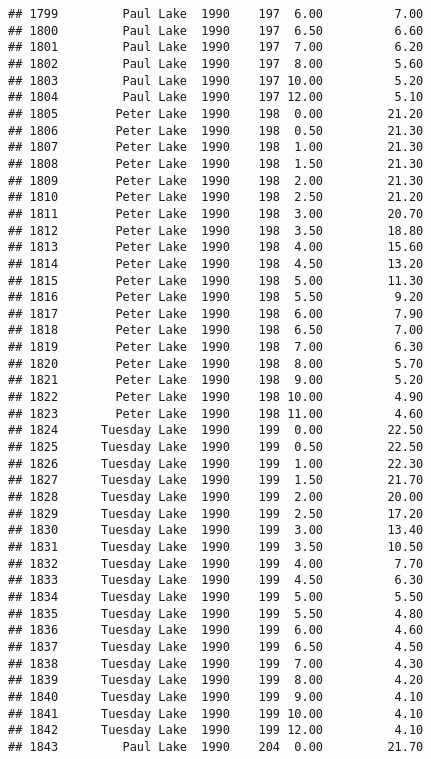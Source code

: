 \documentclass[
]{article}
\begin{document}
\begin{verbatim}
## 1799         Paul Lake  1990    197  6.00          7.00
## 1800         Paul Lake  1990    197  6.50          6.60
## 1801         Paul Lake  1990    197  7.00          6.20
## 1802         Paul Lake  1990    197  8.00          5.60
## 1803         Paul Lake  1990    197 10.00          5.20
## 1804         Paul Lake  1990    197 12.00          5.10
## 1805        Peter Lake  1990    198  0.00         21.20
## 1806        Peter Lake  1990    198  0.50         21.30
## 1807        Peter Lake  1990    198  1.00         21.30
## 1808        Peter Lake  1990    198  1.50         21.30
## 1809        Peter Lake  1990    198  2.00         21.30
## 1810        Peter Lake  1990    198  2.50         21.20
## 1811        Peter Lake  1990    198  3.00         20.70
## 1812        Peter Lake  1990    198  3.50         18.80
## 1813        Peter Lake  1990    198  4.00         15.60
## 1814        Peter Lake  1990    198  4.50         13.20
## 1815        Peter Lake  1990    198  5.00         11.30
## 1816        Peter Lake  1990    198  5.50          9.20
## 1817        Peter Lake  1990    198  6.00          7.90
## 1818        Peter Lake  1990    198  6.50          7.00
## 1819        Peter Lake  1990    198  7.00          6.30
## 1820        Peter Lake  1990    198  8.00          5.70
## 1821        Peter Lake  1990    198  9.00          5.20
## 1822        Peter Lake  1990    198 10.00          4.90
## 1823        Peter Lake  1990    198 11.00          4.60
## 1824      Tuesday Lake  1990    199  0.00         22.50
## 1825      Tuesday Lake  1990    199  0.50         22.50
## 1826      Tuesday Lake  1990    199  1.00         22.30
## 1827      Tuesday Lake  1990    199  1.50         21.70
## 1828      Tuesday Lake  1990    199  2.00         20.00
## 1829      Tuesday Lake  1990    199  2.50         17.20
## 1830      Tuesday Lake  1990    199  3.00         13.40
## 1831      Tuesday Lake  1990    199  3.50         10.50
## 1832      Tuesday Lake  1990    199  4.00          7.70
## 1833      Tuesday Lake  1990    199  4.50          6.30
## 1834      Tuesday Lake  1990    199  5.00          5.50
## 1835      Tuesday Lake  1990    199  5.50          4.80
## 1836      Tuesday Lake  1990    199  6.00          4.60
## 1837      Tuesday Lake  1990    199  6.50          4.50
## 1838      Tuesday Lake  1990    199  7.00          4.30
## 1839      Tuesday Lake  1990    199  8.00          4.20
## 1840      Tuesday Lake  1990    199  9.00          4.10
## 1841      Tuesday Lake  1990    199 10.00          4.10
## 1842      Tuesday Lake  1990    199 12.00          4.10
## 1843         Paul Lake  1990    204  0.00         21.70

\end{verbatim}
\end{document}
